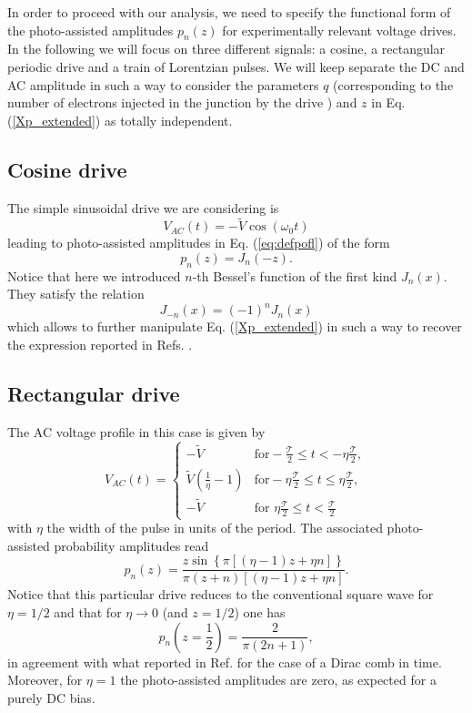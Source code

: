 \documentclass[twocolumn,showpacs,preprintnumbers,amsmath,amssymb%
 aps,
 prb,
 lengthcheck,%
]{revtex4-1}
\def\be{\begin{equation}}
\def\ee{\end{equation}}
\begin{document}
In order to proceed with our analysis, we need to specify the functional form of the photo-assisted amplitudes $p_{n}(z)$ for experimentally relevant voltage drives. In the following we will focus on three different signals: a cosine, a rectangular periodic drive and a train of Lorentzian pulses. \cite{dubois_integer_2013} We will keep separate the DC and AC amplitude in such a way to consider the parameters $q$ (corresponding to the number of electrons injected in the junction by the drive \cite{dubois_integer_2013, rech_minimal_2016}) and $z$ in Eq. (\ref{Xp_extended}) as totally independent. 

\subsection{Cosine drive}
The simple sinusoidal drive we are considering is
\be
V_{AC}(t) = -\tilde{V} \cos \left( \omega_{0} t \right)
\ee
leading to photo-assisted amplitudes in Eq. (\ref{eq:defpofl}) of the form
\be
p_{n}(z) = J_{n} \left(-z\right).
\ee
Notice that here we introduced $n$-th Bessel's function of the first kind $J_{n}(x)$. They satisfy the relation 
\be
J_{-n}(x)= (-1)^{n} J_{n}(x)
\ee
which allows to further manipulate Eq. (\ref{Xp_extended}) in such a way to recover the expression reported in Refs. . 

\subsection{Rectangular drive}
The AC voltage profile in this case is given by 
\be
  V_{AC}(t) = \left\{
    \begin{array}{cc}
      -\tilde{V} & \text{for} -\frac{\mathcal{T}}{2} \leq t <-\eta\frac{\mathcal{T}}{2},\\
     \tilde{V}\left(\frac{1}{\eta}-1 \right) & \text{for} -\eta\frac{\mathcal{T}}{2} \leq t \leq \eta\frac{\mathcal{T}}{2} ,\\
      -\tilde{V} & \text{for }  \eta\frac{\mathcal{T}}{2} \leq t < \frac{\mathcal{T}}{2}
    \end{array} \right.
\ee
with $\eta$ the width of the pulse in units of the period. The associated photo-assisted probability amplitudes read
\be
p_{n}(z)= \frac{z \sin\left\{\pi \left[(\eta-1)z+\eta n \right]\right\}}{\pi (z+n)\left[\left(\eta-1 \right)z+\eta n\right]}.
\ee
Notice that this particular drive reduces to the conventional square wave for $\eta=1/2$ and that for $\eta \rightarrow 0$ (and $z=1/2$) one has
\be
p_{n}(z=\frac{1}{2})= \frac{2}{\pi \left(2n+1 \right)},
\label{Dirac_comb}
\ee
in agreement with what reported in Ref.  for the case of a Dirac comb in time. Moreover, for $\eta=1$ the photo-assisted amplitudes are zero, as expected for a purely DC bias. 
\end{document}
